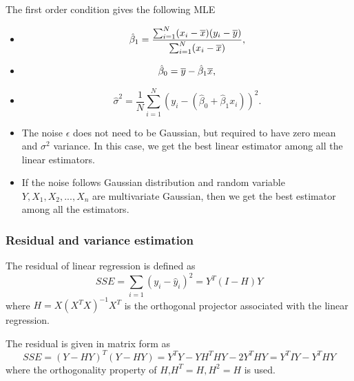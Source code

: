 \begin{refsection}
\begin{corollary}
The first order condition gives the following MLE
\begin{itemize}
	\item $$\hat{\beta}_1 = \frac{\sum_{i=1}^{N} (x_i-\overline{x})(y_i-\overline{y})}{\sum_{i=1}^{N}(x_i-\overline{x})},$$
	\item $$\hat{\beta}_0 = \overline{y} - \hat{\beta}_1\overline{x},$$
	\item $$\hat{\sigma}^2 = \frac{1}{N}\sum_{i=1}^{N}(y_i-(\hat{\beta}_0+\hat{\beta}_1x_i))^2.$$
\end{itemize}		
	
\end{corollary}

\begin{remark}\hfill
\begin{itemize}
	\item The noise $\epsilon$ does not need to be Gaussian, but required to have zero mean and $\sigma^2$ variance. In this case, we get the best linear estimator among all the linear estimators.
	\item If the noise follows Gaussian distribution and random variable $Y,X_1,X_2,...,X_n$ are multivariate Gaussian, then we get the best estimator among all the estimators.
\end{itemize}	
	
\end{remark}




\subsubsection{Residual and variance estimation}
\begin{definition}
	The residual of linear regression is defined as
	$$SSE = \sum_{i=1} (y_i - \hat{y}_i)^2 = Y^T(I-H)Y$$
	where $H=X(X^TX)^{-1}X^T$ is the orthogonal projector associated with the linear regression.
\end{definition}

\begin{remark}[derivation]
	The residual is given in matrix form as $$SSE = (Y - HY)^T(Y-HY) = Y^TY - YH^THY - 2Y^THY = Y^TIY - Y^THY$$
	where the orthogonality property of $H$,$H^T = H,H^2 = H$ is used. 
\end{remark}



\end{refsection}
